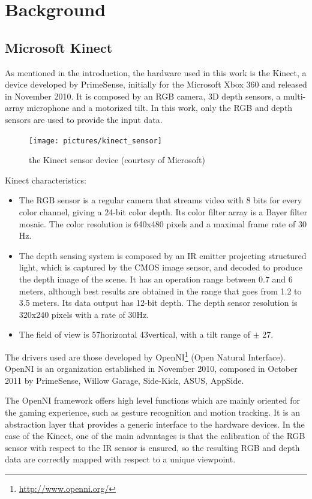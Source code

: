 \chapter{Background}
\label{chap:background}

\section{Microsoft Kinect}

As mentioned in the introduction, the hardware used in this work is the Kinect, a device developed by PrimeSense, initially for the Microsoft Xbox 360 and released in November 2010. It is composed by an RGB camera, 3D depth sensors, a multi-array microphone and a motorized tilt. In this work, only the RGB and depth sensors are used to provide the input data.

\begin{figure}[H]
\centering
\texttt{[image: pictures/kinect\_sensor]}
\caption{the Kinect sensor device (courtesy of Microsoft)}
\end{figure}

Kinect characteristics:
\begin{itemize}
 \item The RGB sensor is a regular camera that streams video with 8 bits for every color channel, giving a 24-bit color depth. Its  color filter array is a Bayer filter mosaic. The color resolution is 640x480 pixels and a maximal frame rate of 30 Hz.
 \item The depth sensing system is composed by an \gls{IR} emitter projecting structured light, which is captured by the CMOS image sensor, and decoded to produce the depth image of the scene. It has an operation range between 0.7 and 6 meters, although best results are obtained in the range that goes from 1.2 to 3.5 meters. Its data output has 12-bit depth. The depth sensor resolution is 320x240 pixels with a rate of 30Hz.
 \item The field of view is 57\textdegree horizontal 43\textdegree vertical, with a tilt range of $\pm$ 27\textdegree.
\end{itemize}

The drivers used are those developed by OpenNI\footnote{\url{http://www.openni.org/}} (Open Natural Interface). OpenNI is an organization established in November 2010, composed in October 2011 by PrimeSense, Willow Garage, Side-Kick, ASUS, AppSide.

The OpenNI framework offers high level functions which are mainly oriented for the gaming experience, such as gesture recognition and motion tracking. It is an abstraction layer that provides a generic interface to the hardware devices. In the case of the Kinect, one of the main advantages is that the calibration of the RGB sensor with respect to the \gls{IR} sensor is ensured, so the resulting RGB and depth data are correctly mapped with respect to a unique viewpoint.


